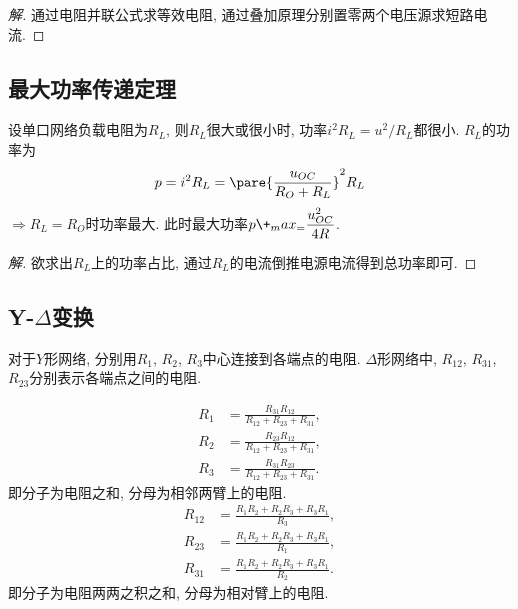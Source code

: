 \documentclass{ctexart}
\begin{document}
\begin{sample}
    \begin{ex}
    \end{ex}
    \begin{proof}[解]
        通过电阻并联公式求等效电阻, 通过叠加原理分别置零两个电压源求短路电流.
    \end{proof}
\end{sample}


\subsection{最大功率传递定理} %
\label{sub:最大功率传递定理}

设单口网络负载电阻为$R_L$, 则$R_L$很大或很小时, 功率$i^2R_L = u^2/R_L$都很小. $R_L$的功率为
\[ p = i^2R_L = \pare{\frac{u_{OC}}{R_O+R_L}}^2R_L \]
$\Rightarrow R_L=R_O$时功率最大. 此时最大功率$p\+_max_ = \displaystyle \frac{u^2_{OC}}{4R}$.

\begin{sample}
    \begin{ex}
    \end{ex}
    \begin{proof}[解]
        欲求出$R_L$上的功率占比, 通过$R_L$的电流倒推电源电流得到总功率即可.
    \end{proof}
\end{sample}


\subsection{Y-\texorpdfstring{$\Delta$}{Delta}变换} %
\label{sub:y_delta变换}

对于$Y$形网络, 分别用$R_1$, $R_2$, $R_3$中心连接到各端点的电阻. $\Delta$形网络中, $R_{12}$, $R_{31}$, $R_{23}$分别表示各端点之间的电阻.
\begin{finale}
    \begin{theorem}[Y-$\Delta$变换]
        \begin{align*}
            R_1 &= \frac{R_{31}R_{12}}{R_{12}+R_{23}+R_{31}},\\
            R_2 &= \frac{R_{23}R_{12}}{R_{12}+R_{23}+R_{31}},\\
            R_3 &= \frac{R_{31}R_{23}}{R_{12}+R_{23}+R_{31}}.
        \end{align*}
        即分子为电阻之和, 分母为相邻两臂上的电阻.
        \begin{align*}
            R_{12} &= \frac{R_1R_2 + R_2R_3 + R_3R_1}{R_3}, \\
            R_{23} &= \frac{R_1R_2 + R_2R_3 + R_3R_1}{R_1}, \\
            R_{31} &= \frac{R_1R_2 + R_2R_3 + R_3R_1}{R_2}.
        \end{align*}
        即分子为电阻两两之积之和, 分母为相对臂上的电阻.
    \end{theorem}
\end{finale}
\end{document}
